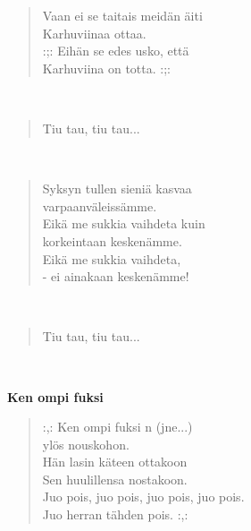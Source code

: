 \noindent\begin{minipage}{\linewidth}
\begin{verse}
	Vaan ei se taitais meidän äiti\\
	Karhuviinaa ottaa.\\
	:;: Eihän se edes usko, että\\
	Karhuviina on totta. :;:\\
\end{verse}
\end{minipage}\\[10pt]
\noindent\begin{minipage}{\linewidth}
\begin{verse}
	Tiu tau, tiu tau...\\
\end{verse}
\end{minipage}\\[10pt]
\noindent\begin{minipage}{\linewidth}
\begin{verse}
	Syksyn tullen sieniä kasvaa\\
	varpaanväleissämme.\\
	Eikä me sukkia vaihdeta kuin\\
	korkeintaan keskenämme.\\
	Eikä me sukkia vaihdeta,\\
	- ei ainakaan keskenämme!\\
\end{verse}
\end{minipage}\\[10pt]
\noindent\begin{minipage}{\linewidth}
\begin{verse}
	Tiu tau, tiu tau...\\
\end{verse}
\end{minipage}\\[10pt]
%
%
\noindent\begin{minipage}{\linewidth}
\vspace{5pt}
\parbox[t]{0.85\linewidth}{\raggedright {\large\bf Ken ompi fuksi}\\[6pt]}
\begin{verse}
	\hspace{0pt-\widthof{:,: }}:,: Ken ompi fuksi n (jne...)\\
	ylös nouskohon.\\
	Hän lasin käteen ottakoon\\
	Sen huulillensa nostakoon.\\
	Juo pois, juo pois, juo pois, juo pois.\\
	Juo herran tähden pois. :,:\\
\end{verse}
\end{minipage}\\[10pt]
